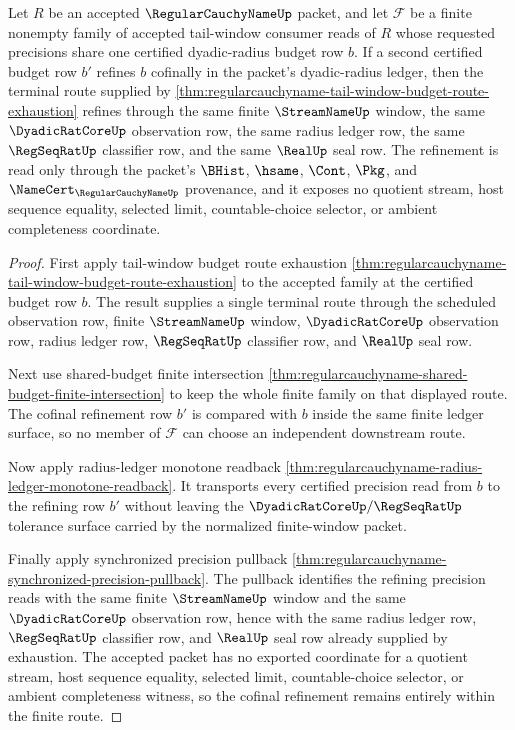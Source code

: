 \begin{theorem}
\label{thm:regularcauchyname-cofinal-budget-refinement}
Let $R$ be an accepted $\RegularCauchyNameUp$ packet, and let $\mathcal{F}$ be a finite nonempty family of accepted tail-window consumer reads of $R$ whose requested precisions share one certified dyadic-radius budget row $b$. If a second certified budget row $b'$ refines $b$ cofinally in the packet's dyadic-radius ledger, then the terminal route supplied by \autoref{thm:regularcauchyname-tail-window-budget-route-exhaustion} refines through the same finite $\StreamNameUp$ window, the same $\DyadicRatCoreUp$ observation row, the same radius ledger row, the same $\RegSeqRatUp$ classifier row, and the same $\RealUp$ seal row. The refinement is read only through the packet's $\BHist$, $\hsame$, $\Cont$, $\Pkg$, and $\NameCert_{\RegularCauchyNameUp}$ provenance, and it exposes no quotient stream, host sequence equality, selected limit, countable-choice selector, or ambient completeness coordinate.
\end{theorem}
\begin{proof}
First apply tail-window budget route exhaustion \autoref{thm:regularcauchyname-tail-window-budget-route-exhaustion} to the accepted family at the certified budget row $b$. The result supplies a single terminal route through the scheduled observation row, finite $\StreamNameUp$ window, $\DyadicRatCoreUp$ observation row, radius ledger row, $\RegSeqRatUp$ classifier row, and $\RealUp$ seal row.

Next use shared-budget finite intersection \autoref{thm:regularcauchyname-shared-budget-finite-intersection} to keep the whole finite family on that displayed route. The cofinal refinement row $b'$ is compared with $b$ inside the same finite ledger surface, so no member of $\mathcal{F}$ can choose an independent downstream route.

Now apply radius-ledger monotone readback \autoref{thm:regularcauchyname-radius-ledger-monotone-readback}. It transports every certified precision read from $b$ to the refining row $b'$ without leaving the $\DyadicRatCoreUp/\RegSeqRatUp$ tolerance surface carried by the normalized finite-window packet.

Finally apply synchronized precision pullback \autoref{thm:regularcauchyname-synchronized-precision-pullback}. The pullback identifies the refining precision reads with the same finite $\StreamNameUp$ window and the same $\DyadicRatCoreUp$ observation row, hence with the same radius ledger row, $\RegSeqRatUp$ classifier row, and $\RealUp$ seal row already supplied by exhaustion. The accepted packet has no exported coordinate for a quotient stream, host sequence equality, selected limit, countable-choice selector, or ambient completeness witness, so the cofinal refinement remains entirely within the finite route.
\end{proof}

